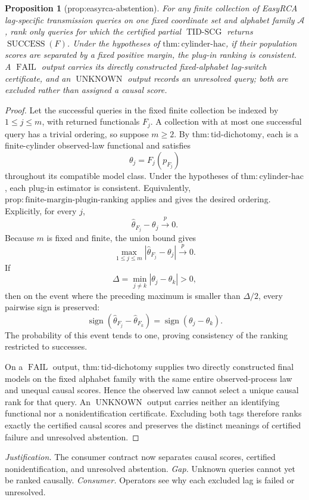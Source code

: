 \documentclass{article}
\newtheorem{proposition}{Proposition}
\begin{document}
\begin{proposition}[prop:easyrca-abstention]\label{prop:easyrca-abstention}
For any finite collection of EasyRCA lag-specific transmission queries on one fixed coordinate set and alphabet family \(\mathcal A\), rank only queries for which the certified partial \(\operatorname{TID\text{-}SCG}\) returns \(\operatorname{SUCCESS}(F)\).  Under the hypotheses of \(\mathrm{thm:cylinder\text{-}hac}\), if their population scores are separated by a fixed positive margin, the plug-in ranking is consistent.  A \(\operatorname{FAIL}\) output carries its directly constructed fixed-alphabet lag-switch certificate, and an \(\operatorname{UNKNOWN}\) output records an unresolved query; both are excluded rather than assigned a causal score.
\end{proposition}
\begin{proof}
Let the successful queries in the fixed finite collection be indexed by \(1\leq j\leq m\), with returned functionals \(F_j\).  A collection with at most one successful query has a trivial ordering, so suppose \(m\geq2\).  By \(\mathrm{thm:tid\text{-}dichotomy}\), each is a finite-cylinder observed-law functional and satisfies
\[
 \theta_j=F_j(p_{F_j})
\]
throughout its compatible model class.  Under the hypotheses of \(\mathrm{thm:cylinder\text{-}hac}\), each plug-in estimator is consistent.  Equivalently, \(\mathrm{prop:finite\text{-}margin\text{-}plugin\text{-}ranking}\) applies and gives the desired ordering.  Explicitly, for every \(j\),
\[
 \widehat\theta_{F_j}-\theta_j\overset p\longrightarrow0.
\]
Because \(m\) is fixed and finite, the union bound gives
\[
 \max_{1\leq j\leq m}|\widehat\theta_{F_j}-\theta_j|
 \overset p\longrightarrow0.
\]
If
\[
 \Delta=\min_{j\ne k}|\theta_j-\theta_k|>0,
\]
then on the event where the preceding maximum is smaller than \(\Delta/2\), every pairwise sign is preserved:
\[
 \operatorname{sign}(\widehat\theta_{F_j}-\widehat\theta_{F_k})
 =\operatorname{sign}(\theta_j-\theta_k).
\]
The probability of this event tends to one, proving consistency of the ranking restricted to successes.

On a \(\operatorname{FAIL}\) output, \(\mathrm{thm:tid\text{-}dichotomy}\) supplies two directly constructed final models on the fixed alphabet family with the same entire observed-process law and unequal causal scores.  Hence the observed law cannot select a unique causal rank for that query.  An \(\operatorname{UNKNOWN}\) output carries neither an identifying functional nor a nonidentification certificate.  Excluding both tags therefore ranks exactly the certified causal scores and preserves the distinct meanings of certified failure and unresolved abstention.
\end{proof}
\par\smallskip\noindent \textit{Justification.} The consumer contract now separates causal scores, certified nonidentification, and unresolved abstention. \textit{Gap.} Unknown queries cannot yet be ranked causally. \textit{Consumer.} Operators see why each excluded lag is failed or unresolved.
\end{document}
